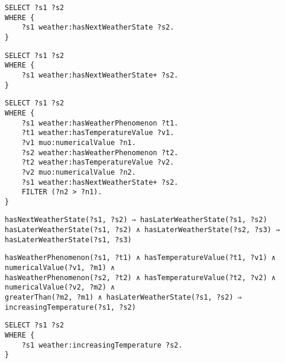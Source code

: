 \begin{lstlisting}
SELECT ?s1 ?s2
WHERE {
    ?s1 weather:hasNextWeatherState ?s2.
}
\end{lstlisting}

\begin{lstlisting}
SELECT ?s1 ?s2
WHERE {
    ?s1 weather:hasNextWeatherState+ ?s2.
}
\end{lstlisting}

\begin{lstlisting}
SELECT ?s1 ?s2
WHERE {
    ?s1 weather:hasWeatherPhenomenon ?t1.
    ?t1 weather:hasTemperatureValue ?v1.
    ?v1 muo:numericalValue ?n1.
    ?s2 weather:hasWeatherPhenomenon ?t2.
    ?t2 weather:hasTemperatureValue ?v2.
    ?v2 muo:numericalValue ?n2.
    ?s1 weather:hasNextWeatherState+ ?s2.
    FILTER (?n2 > ?n1).
}
\end{lstlisting}

\begin{lstlisting}
hasNextWeatherState(?s1, ?s2) ⇒ hasLaterWeatherState(?s1, ?s2)
hasLaterWeatherState(?s1, ?s2) ∧ hasLaterWeatherState(?s2, ?s3) ⇒ hasLaterWeatherState(?s1, ?s3)
\end{lstlisting}

\begin{lstlisting}
hasWeatherPhenomenon(?s1, ?t1) ∧ hasTemperatureValue(?t1, ?v1) ∧ numericalValue(?v1, ?m1) ∧
hasWeatherPhenomenon(?s2, ?t2) ∧ hasTemperatureValue(?t2, ?v2) ∧ numericalValue(?v2, ?m2) ∧ 
greaterThan(?m2, ?m1) ∧ hasLaterWeatherState(?s1, ?s2) ⇒ increasingTemperature(?s1, ?s2)
\end{lstlisting}

\begin{lstlisting}
SELECT ?s1 ?s2
WHERE {
    ?s1 weather:increasingTemperature ?s2.
}
\end{lstlisting}
